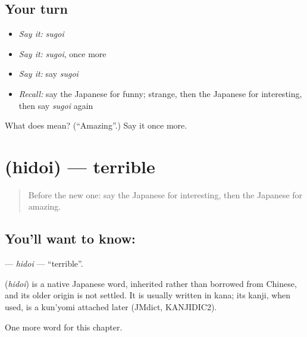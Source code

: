 \subsection*{Your turn}
\begin{itemize}
\raggedright
  \item \emph{Say it:} \emph{sugoi}
  \item \emph{Say it:} \emph{sugoi}, once more
  \item \emph{Say it:} say \emph{sugoi}
  \item \emph{Recall:} say the Japanese for funny; strange, then the Japanese for interesting, then say \emph{sugoi} again
\end{itemize}

\begin{tcolorbox}[breakable,colback=teal!4,colframe=teal!35!black,title={Before you move on}]
What does  mean? (\textquotedblleft{}Amazing\textquotedblright{}.) Say it once more.
\end{tcolorbox}
\section[\texorpdfstring{\ja{ひどい} (hidoi)}{ひどい (hidoi)}]{ (hidoi) — terrible}

\label{lesson:JA-C125-hidoi}



\begin{quote}
Before the new one: say the Japanese for interesting, then the Japanese for amazing.
\end{quote}

\subsection*{You'll want to know: }
\textbf{} — \emph{hidoi} — \textquotedblleft{}terrible\textquotedblright{}.

\begin{cousinweb}
\textbf{} (\emph{hidoi}) is a native Japanese word, inherited rather than borrowed from Chinese, and its older origin is not settled. It is usually written in kana; its kanji, when used, is a kun'yomi attached later (JMdict, KANJIDIC2).
\end{cousinweb}

\begin{grammarlens}[title={What you've built}]
One more word for this chapter.
\end{grammarlens}

